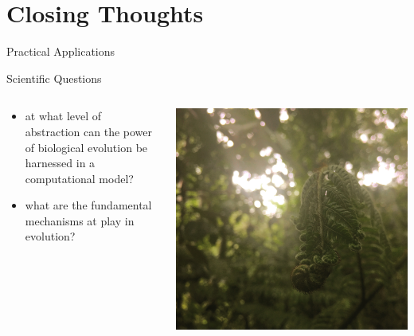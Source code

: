 \section{Closing Thoughts}
\begin{frame}{Practical Applications}

\end{frame}

\begin{frame}{Scientific Questions}
\begin{columns}
\begin{column}{0.6\textwidth}
\begin{itemize}
\item at what level of abstraction can the power of biological evolution be harnessed in a computational model?
\item what are the fundamental mechanisms at play in evolution?
\end{itemize}
\end{column}
\begin{column}{0.4\textwidth}
\begin{center}
\includegraphics[width=\textwidth,trim={18cm 0 27cm 0},clip]{img/tropical_fern}
\end{center}
\end{column}
\end{columns}
\end{frame}

